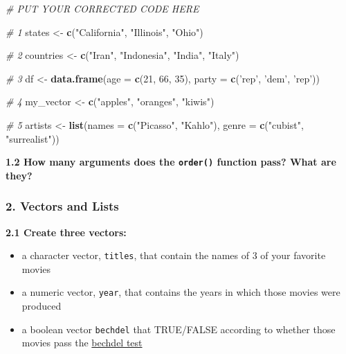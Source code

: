 \documentclass[]{book}
\newenvironment{Shaded}{\begin{snugshade}}{\end{snugshade}}
\newcommand{\CommentTok}[1]{\textcolor[rgb]{0.56,0.35,0.01}{\textit{#1}}}
\newcommand{\DataTypeTok}[1]{\textcolor[rgb]{0.13,0.29,0.53}{#1}}
\newcommand{\DecValTok}[1]{\textcolor[rgb]{0.00,0.00,0.81}{#1}}
\newcommand{\KeywordTok}[1]{\textcolor[rgb]{0.13,0.29,0.53}{\textbf{#1}}}
\newcommand{\NormalTok}[1]{#1}
\newcommand{\StringTok}[1]{\textcolor[rgb]{0.31,0.60,0.02}{#1}}
\begin{document}
\begin{Shaded}
\begin{Highlighting}[]
\CommentTok{# PUT YOUR CORRECTED CODE HERE}

\CommentTok{# 1}
\NormalTok{states <-}\StringTok{ }\KeywordTok{c}\NormalTok{(}\StringTok{"California"}\NormalTok{, }\StringTok{"Illinois"}\NormalTok{, }\StringTok{"Ohio"}\NormalTok{)}

\CommentTok{# 2}
\NormalTok{countries <-}\StringTok{ }\KeywordTok{c}\NormalTok{(}\StringTok{"Iran"}\NormalTok{, }\StringTok{"Indonesia"}\NormalTok{, }\StringTok{"India"}\NormalTok{, }\StringTok{"Italy"}\NormalTok{)}

\CommentTok{# 3}
\NormalTok{df <-}\StringTok{ }\KeywordTok{data.frame}\NormalTok{(}\DataTypeTok{age =} \KeywordTok{c}\NormalTok{(}\DecValTok{21}\NormalTok{, }\DecValTok{66}\NormalTok{, }\DecValTok{35}\NormalTok{),}
                 \DataTypeTok{party =} \KeywordTok{c}\NormalTok{(}\StringTok{'rep'}\NormalTok{, }\StringTok{'dem'}\NormalTok{, }\StringTok{'rep'}\NormalTok{))}

\CommentTok{# 4}
\NormalTok{my_vector <-}\StringTok{ }\KeywordTok{c}\NormalTok{(}\StringTok{"apples"}\NormalTok{, }\StringTok{"oranges"}\NormalTok{, }\StringTok{"kiwis"}\NormalTok{)}

\CommentTok{# 5}
\NormalTok{artists <-}\StringTok{ }\KeywordTok{list}\NormalTok{(}\DataTypeTok{names =} \KeywordTok{c}\NormalTok{(}\StringTok{"Picasso"}\NormalTok{, }\StringTok{"Kahlo"}\NormalTok{),}
                \DataTypeTok{genre =} \KeywordTok{c}\NormalTok{(}\StringTok{"cubist"}\NormalTok{, }\StringTok{"surrealist"}\NormalTok{))}
\end{Highlighting}
\end{Shaded}

\textbf{1.2 How many arguments does the \texttt{order()} function pass? What are they?}

\hypertarget{vectors-and-lists}{%
\subsubsection*{2. Vectors and Lists}\label{vectors-and-lists}}

\textbf{2.1 Create three vectors:}

\begin{itemize}
\item
  a character vector, \texttt{titles}, that contain the names of 3 of your favorite movies
\item
  a numeric vector, \texttt{year}, that contains the years in which those movies were produced
\item
  a boolean vector \texttt{bechdel} that TRUE/FALSE according to whether those movies pass the \href{http://bechdeltest.com/}{bechdel test}
\end{itemize}
\end{document}
